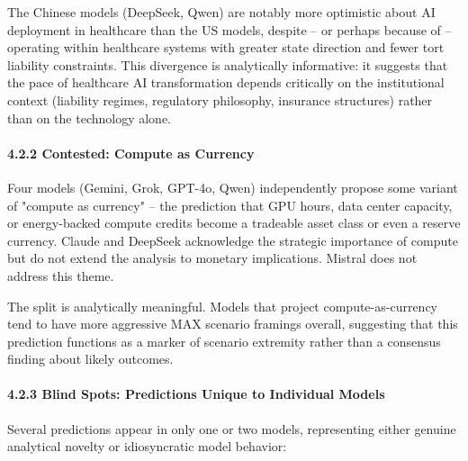 \documentclass{article}
\begin{document}
The Chinese models (DeepSeek, Qwen) are notably more optimistic about AI deployment in healthcare than the US models, despite -- or perhaps because of -- operating within healthcare systems with greater state direction and fewer tort liability constraints. This divergence is analytically informative: it suggests that the pace of healthcare AI transformation depends critically on the institutional context (liability regimes, regulatory philosophy, insurance structures) rather than on the technology alone.


\paragraph{4.2.2 Contested: Compute as Currency}

Four models (Gemini, Grok, GPT-4o, Qwen) independently propose some variant of "compute as currency" -- the prediction that GPU hours, data center capacity, or energy-backed compute credits become a tradeable asset class or even a reserve currency. Claude and DeepSeek acknowledge the strategic importance of compute but do not extend the analysis to monetary implications. Mistral does not address this theme.

The split is analytically meaningful. Models that project compute-as-currency tend to have more aggressive MAX scenario framings overall, suggesting that this prediction functions as a marker of scenario extremity rather than a consensus finding about likely outcomes.


\paragraph{4.2.3 Blind Spots: Predictions Unique to Individual Models}

Several predictions appear in only one or two models, representing either genuine analytical novelty or idiosyncratic model behavior:
\end{document}

